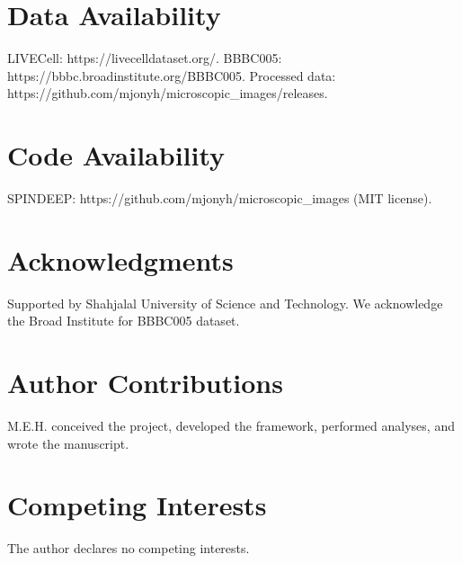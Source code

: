 \documentclass[10pt,twocolumn]{article}
\begin{document}
\section*{Data Availability}
LIVECell: https://livecelldataset.org/. BBBC005: https://bbbc.broadinstitute.org/BBBC005. Processed data: https://github.com/mjonyh/microscopic_images/releases.

\section*{Code Availability}
SPINDEEP: https://github.com/mjonyh/microscopic_images (MIT license).

\section*{Acknowledgments}
Supported by Shahjalal University of Science and Technology. We acknowledge the Broad Institute for BBBC005 dataset.

\section*{Author Contributions}
M.E.H. conceived the project, developed the framework, performed analyses, and wrote the manuscript.

\section*{Competing Interests}
The author declares no competing interests.
\end{document}
